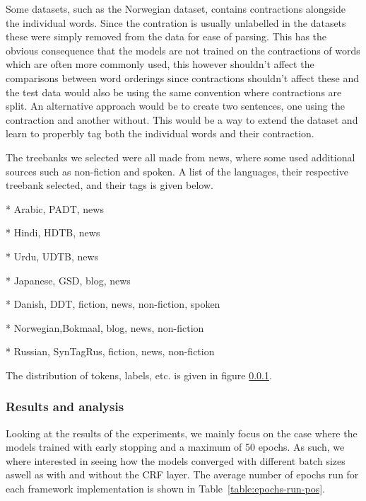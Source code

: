 Some datasets, such as the Norwegian dataset, contains contractions alongside
the individual words. Since the contration is usually unlabelled in the datasets
these were simply removed from the data for ease of parsing. This has the
obvious consequence that the models are not trained on the contractions of words
which are often more commonly used, this however shouldn't affect the
comparisons between word orderings since contractions shouldn't affect these and
the test data would also be using the same convention where contractions are
split. An alternative approach would be to create two sentences, one using the
contraction and another without. This would be a way to extend the dataset and
learn to properbly tag both the individual words and their contraction.

The treebanks we selected were all made from news, where some used additional
sources such as non-fiction and spoken. A list of the languages, their
respective treebank selected, and their tags is given below.

* Arabic,   PADT, news

* Hindi,    HDTB, news

* Urdu,     UDTB, news

* Japanese, GSD, blog, news

* Danish,   DDT, fiction, news, non-fiction, spoken

* Norwegian,Bokmaal, blog, news, non-fiction

* Russian,  SynTagRus, fiction, news, non-fiction

The distribution of tokens, labels, etc. is given in figure \ref{}.

\subsubsection{Results and analysis}

Looking at the results of the experiments, we mainly focus on the case where the
models trained with early stopping and a maximum of 50 epochs. As such, we where
interested in seeing how the models converged with different batch sizes aswell
as with and without the CRF layer. The average number of epochs run for each
framework implementation is shown in Table~\ref{table:epochs-run-pos}.


